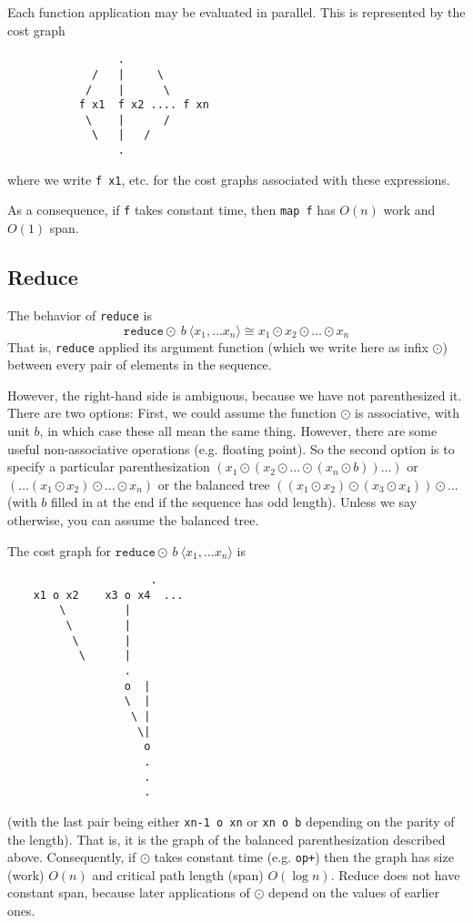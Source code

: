 Each function application may be evaluated in parallel.  This is
represented by the cost graph
\begin{verbatim}
                 .
             /   |     \
            /    |      \
           f x1  f x2 .... f xn
            \    |      /
             \   |   /
                 .
\end{verbatim}
where we write \verb|f x1|, etc. for the cost graphs associated with
these expressions.

As a consequence, if \verb|f| takes constant time, then \verb|map f| has
$O(n)$ work and $O(1)$ span.

\subsection*{Reduce}

The behavior of \verb|reduce| is
\[
\texttt{reduce} \odot \: b \: \langle x_1,\ldots x_n \rangle \cong x_1 \odot x_2 \odot \ldots \odot x_n
\]
That is, \verb|reduce| applied its argument function (which we write
here as infix $\odot$) between every pair of elements in the sequence.

However, the right-hand side is ambiguous, because we have not
parenthesized it.  There are two options: First, we could assume the
function $\odot$ is associative, with unit $b$, in which case these all
mean the same thing.  However, there are some useful non-associative
operations (e.g. floating point).  So the second option is to specify a
particular parenthesization $(x_1 \odot (x_2 \odot \ldots \odot (x_n
\odot b))\ldots)$ or $(\ldots (x_1 \odot x_2) \odot \ldots \odot x_n)$
or the balanced tree $((x_1 \odot x_2) \odot (x_3 \odot x_4)) \odot
\ldots$ (with $b$ filled in at the end if the sequence has odd length).
Unless we say otherwise, you can assume the balanced tree.

The cost graph for $\texttt{reduce} \odot \: b \: \langle x_1,\ldots x_n \rangle$ is
\begin{verbatim}
                      .
    x1 o x2    x3 o x4  ...
        \         |
         \        |
          \       |
           \      |
                  .
                  o  |
                  \  |
                   \ |
                    \|
                     o
                     .
                     .
                     .
\end{verbatim}
(with the last pair being either \verb|xn-1 o xn| or \verb|xn o b|
depending on the parity of the length).  That is, it is the graph of the
balanced parenthesization described above.  Consequently, if $\odot$
takes constant time (e.g. \verb|op+|) then the graph has size (work)
$O(n)$ and critical path length (span) $O(\log n)$.  Reduce does not
have constant span, because later applications of $\odot$ depend on the
values of earlier ones.

